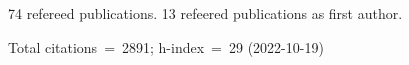 74 refereed publications. 13 refeered publications as first author.

Total citations~=~2891; h-index~=~29 (2022-10-19)